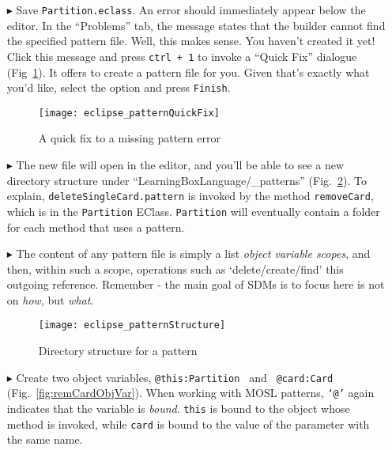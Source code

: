 \begin{itemize}
\item[$\blacktriangleright$] Save \texttt{Partition.eclass}. An error should immediately appear below the editor. In the ``Problems'' tab, the message
states that the builder cannot find the specified pattern file. Well, this makes sense. You haven't created it yet! Click this message and press \texttt{ctrl +
1} to invoke a ``Quick Fix'' dialogue (Fig~\ref{fig:quixFix}). It offers to create a pattern file for you. Given that's exactly what you'd like, select the option
and press \texttt{Finish}.

\vspace{0.5cm}

\begin{figure}[htp]
\begin{center}
  \texttt{[image: eclipse\_patternQuickFix]}
  \caption{A quick fix to a missing pattern error}
  \label{fig:quixFix}
\end{center}
\end{figure}

\item[$\blacktriangleright$] The new file will open in the editor, and you'll be able to see a new directory structure under ``LearningBoxLanguage/\_patterns''
(Fig.~\ref{fig:pattStruct}). To explain, \texttt{deleteSingleCard.pattern} is invoked by the method \texttt{removeCard}, which is in the \texttt{Partition}
EClass. \texttt{Partition} will eventually contain a folder for each method that uses a pattern.

\vspace{0.5cm}

\item[$\blacktriangleright$] The content of any pattern file is simply a list \emph{object variable scopes}, and then,
within such a scope, operations such as `delete/create/find' this outgoing reference. Remember - the main goal of SDMs is to focus here is not on \emph{how},
but \emph{what}.

\newpage

\begin{figure}[htp]
\begin{center}
  \texttt{[image: eclipse\_patternStructure]}
  \caption{Directory structure for a pattern}
  \label{fig:pattStruct}
\end{center}
\end{figure}

\item[$\blacktriangleright$] Create two object variables, \texttt{@this:Partition } and \texttt{ @card:Card}\\ (Fig.~\ref{fig:remCardObjVar}). When working
with MOSL patterns, \texttt{`@'} again indicates that the variable is \emph{bound}. \texttt{this} is bound to the object whose method is invoked,
while \texttt{card} is bound to the value of the parameter with the same name.


\end{itemize}
